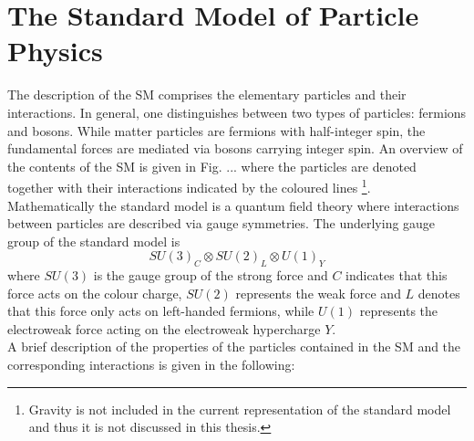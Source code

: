 \section{The Standard Model of Particle Physics}
\label{sec:sm}
The description of the SM comprises the elementary particles and their interactions. In general, one distinguishes between two types of particles: fermions and bosons. While matter particles are fermions with half-integer spin, the fundamental forces are mediated via bosons carrying integer spin. An overview of the contents of the SM is given in Fig. ... where the particles are denoted together with their interactions indicated by the coloured lines \footnote{Gravity is not included in the current representation of the standard model and thus it is not discussed in this thesis.}. \\
Mathematically the standard model is a quantum field theory where interactions between particles are described via gauge symmetries. The underlying gauge group of the standard model is 
\begin{equation*}
SU(3)_{C} \otimes SU(2)_{L} \otimes U(1)_{Y}
\end{equation*}
where $SU(3)$ is the gauge group of the strong force and $C$ indicates that this force acts on the colour charge, $SU(2)$ represents the weak force and $L$ denotes that this force only acts on left-handed fermions, while $U(1)$ represents the electroweak force acting on the electroweak hypercharge $Y$.\\
A brief description of the properties of the particles contained in the SM and the corresponding interactions is given in the following:
